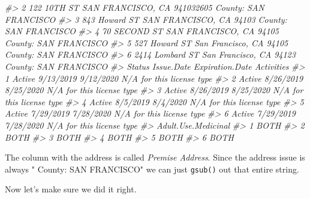 \documentclass[
]{krantz}
\makeatletter
\newenvironment{Shaded}{\begin{snugshade}}{\end{snugshade}}
\newcommand{\CommentTok}[1]{\textcolor[rgb]{0.37,0.37,0.37}{\textit{#1}}}
\newcommand{\FunctionTok}[1]{\textcolor[rgb]{0,0,0}{#1}}
\newcommand{\NormalTok}[1]{#1}
\newcommand{\OtherTok}[1]{\textcolor[rgb]{0.37,0.37,0.37}{#1}}
\newcommand{\SpecialCharTok}[1]{\textcolor[rgb]{0,0,0}{#1}}
\newcommand{\StringTok}[1]{\textcolor[rgb]{0.5,0.5,0.5}{#1}}
\newenvironment{kframe}{%
\medskip{}
\setlength{\fboxsep}{.8em}
 \def\at@end@of@kframe{}%
 \ifinner\ifhmode%
  \def\at@end@of@kframe{\end{minipage}}%
  \begin{minipage}{\columnwidth}%
 \fi\fi%
 \def\FrameCommand##1{\hskip\@totalleftmargin \hskip-\fboxsep
 \colorbox{shadecolor}{##1}\hskip-\fboxsep
     \hskip-\linewidth \hskip-\@totalleftmargin \hskip\columnwidth}%
 \MakeFramed {\advance\hsize-\width
   \@totalleftmargin\z@ \linewidth\hsize
   \@setminipage}}%
 {\par\unskip\endMakeFramed%
 \at@end@of@kframe}
\renewenvironment{Shaded}{\begin{kframe}}{\end{kframe}}
\makeatother
\begin{document}
\begin{Shaded}
\begin{Highlighting}[]
\CommentTok{\#\textgreater{} 2 122 10TH ST SAN FRANCISCO, CA 941032605 County: SAN FRANCISCO}
\CommentTok{\#\textgreater{} 3   843 Howard ST SAN FRANCISCO, CA 94103 County: SAN FRANCISCO}
\CommentTok{\#\textgreater{} 4    70 SECOND ST SAN FRANCISCO, CA 94105 County: SAN FRANCISCO}
\CommentTok{\#\textgreater{} 5   527 Howard ST San Francisco, CA 94105 County: SAN FRANCISCO}
\CommentTok{\#\textgreater{} 6 2414 Lombard ST San Francisco, CA 94123 County: SAN FRANCISCO}
\CommentTok{\#\textgreater{}   Status Issue.Date Expiration.Date                Activities}
\CommentTok{\#\textgreater{} 1 Active  9/13/2019       9/12/2020 N/A for this license type}
\CommentTok{\#\textgreater{} 2 Active  8/26/2019       8/25/2020 N/A for this license type}
\CommentTok{\#\textgreater{} 3 Active  8/26/2019       8/25/2020 N/A for this license type}
\CommentTok{\#\textgreater{} 4 Active   8/5/2019        8/4/2020 N/A for this license type}
\CommentTok{\#\textgreater{} 5 Active  7/29/2019       7/28/2020 N/A for this license type}
\CommentTok{\#\textgreater{} 6 Active  7/29/2019       7/28/2020 N/A for this license type}
\CommentTok{\#\textgreater{}   Adult.Use.Medicinal}
\CommentTok{\#\textgreater{} 1                BOTH}
\CommentTok{\#\textgreater{} 2                BOTH}
\CommentTok{\#\textgreater{} 3                BOTH}
\CommentTok{\#\textgreater{} 4                BOTH}
\CommentTok{\#\textgreater{} 5                BOTH}
\CommentTok{\#\textgreater{} 6                BOTH}
\end{Highlighting}
\end{Shaded}

The column with the address is called \emph{Premise Address}. Since the address issue is always " County: SAN FRANCISCO" we can just \texttt{gsub()} out that entire string.

\begin{Shaded}
\end{Shaded}

Now let's make sure we did it right.
\end{document}
